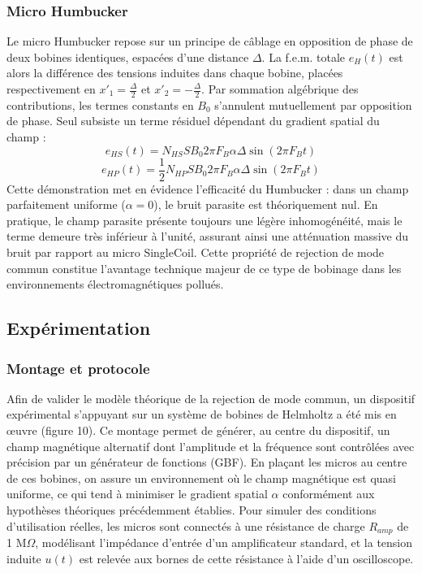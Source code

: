 \documentclass[11pt, a4paper]{article}
\begin{document}
\subsubsection{Micro Humbucker}
Le micro Humbucker repose sur un principe de câblage en opposition de phase de deux bobines identiques, espacées d'une distance $\Delta$. La f.e.m. totale $e_H(t)$ est alors la différence des tensions induites dans chaque bobine, placées respectivement en $x'_1 = \frac{\Delta}{2}$ et $x'_2 = -\frac{\Delta}{2}$. Par sommation algébrique des contributions, les termes constants en $B_0$ s'annulent mutuellement par opposition de phase. Seul subsiste un terme résiduel dépendant du gradient spatial du champ :
\begin{equation}
e_{HS}(t) = N_{HS} S B_0 2\pi F_B \alpha \Delta \sin(2\pi F_B t)
\end{equation}
\begin{equation}
e_{HP}(t) = \frac{1}{2} N_{HP} S B_0 2\pi F_B \alpha \Delta \sin(2\pi F_B t)
\end{equation}
Cette démonstration met en évidence l'efficacité du Humbucker : dans un champ parfaitement uniforme ($\alpha = 0$), le bruit parasite est théoriquement nul. En pratique, le champ parasite présente toujours une légère inhomogénéité, mais le terme demeure très inférieur à l'unité, assurant ainsi une atténuation massive du bruit par rapport au micro SingleCoil. Cette propriété de rejection de mode commun constitue l'avantage technique majeur de ce type de bobinage dans les environnements électromagnétiques pollués.

\subsection{Expérimentation}
\subsubsection{Montage et protocole}
Afin de valider le modèle théorique de la rejection de mode commun, un dispositif expérimental s'appuyant sur un système de bobines de Helmholtz a été mis en œuvre (figure 10). Ce montage permet de générer, au centre du dispositif, un champ magnétique alternatif dont l'amplitude et la fréquence sont contrôlées avec précision par un générateur de fonctions (GBF). En plaçant les micros au centre de ces bobines, on assure un environnement où le champ magnétique est quasi uniforme, ce qui tend à minimiser le gradient spatial $\alpha$ conformément aux hypothèses théoriques précédemment établies. Pour simuler des conditions d'utilisation réelles, les micros sont connectés à une résistance de charge $R_{amp}$ de 1 M$\Omega$, modélisant l'impédance d'entrée d'un amplificateur standard, et la tension induite $u(t)$ est relevée aux bornes de cette résistance à l'aide d'un oscilloscope.
\end{document}
